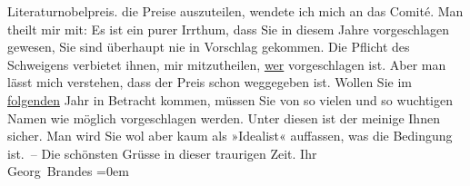 \begin{ledgroupsized}[t]{13cm}
{{{                  Literaturnobelpreis.}}}\label{K_L02198-1h} die Preise auszuteilen, wendete ich mich an das Comité. Man theilt mir mit:\pend
           \pstart
           Es ist ein purer Irrthum, dass Sie in diesem Jahre vorgeschlagen gewesen, Sie sind
               überhaupt nie in Vorschlag gekommen. Die Pflicht des Schweigens verbietet ihnen, mir
               mitzutheilen, \uline{wer} vorgeschlagen ist. Aber man lässt
               mich verstehen, dass der Preis schon weggegeben ist.\pend
           \pstart
           Wollen Sie im \uline{folgenden} Jahr in Betracht kommen,
               müssen Sie  von so vielen und so wuchtigen
               Namen wie möglich vorgeschlagen werden. Unter diesen ist der meinige Ihnen sicher.
               Man wird Sie wol aber kaum als »Idealist« auffassen, was die Bedingung ist. – Die
               schönsten Grüsse in dieser traurigen Zeit.\pend
           \pstart
           Ihr{\\[\baselineskip]}\spacefill\mbox{Georg Brandes}\pend
           \leftskip=0em{}
         
         \endnumbering{}\end{ledgroupsized}  \newcommand{\dateiname}{L02198}\newcommand{\titel}{Georg Brandes an Arthur Schnitzler, 18. 10. 1914}\newcommand{\editorInnen}{Martin Anton Müller und Gerd-Hermann Susen}
      